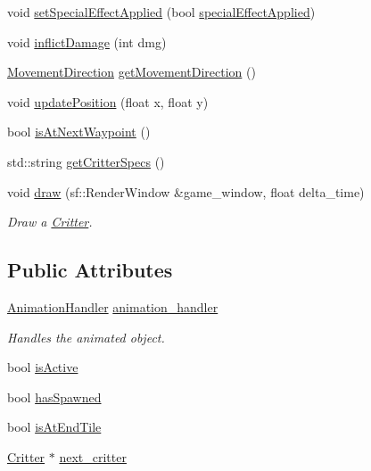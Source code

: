 \begin{DoxyCompactItemize}
\item 
void \hyperlink{class_critter_a662c3e493cd09b78df86afdc3c0725df}{set\+Special\+Effect\+Applied} (bool \hyperlink{class_critter_aa30e57414bd64c920dca286f87da5c3f}{special\+Effect\+Applied})
\item 
void \hyperlink{class_critter_a3601e12d79247c3345e9e828688cf321}{inflict\+Damage} (int dmg)
\item 
\hyperlink{class_critter_a42f4af08084e39edfdb55e38a5858cc4}{Movement\+Direction} \hyperlink{class_critter_affcdf706975d5a761acec7e5effea7b1}{get\+Movement\+Direction} ()
\item 
void \hyperlink{class_critter_a96462bdb554e60ee1c3bb76d7cde3da6}{update\+Position} (float x, float y)
\item 
bool \hyperlink{class_critter_ac2d188c14e482de7e28a9520d6f62a16}{is\+At\+Next\+Waypoint} ()
\item 
std\+::string \hyperlink{class_critter_ae0799b0a4602623632fa382e5ad0d0c8}{get\+Critter\+Specs} ()
\item 
void \hyperlink{class_critter_afe6dafa77006e5b6b7f3f905447af3fb}{draw} (sf\+::\+Render\+Window \&game\+\_\+window, float delta\+\_\+time)
\begin{DoxyCompactList}\small\item\em Draw a \hyperlink{class_critter}{Critter}. \end{DoxyCompactList}\end{DoxyCompactItemize}
\subsection*{Public Attributes}
\begin{DoxyCompactItemize}
\item 
\hyperlink{class_animation_handler}{Animation\+Handler} \hyperlink{class_critter_a9792a56974224a81ca5ceec3eb967ad6}{animation\+\_\+handler}
\begin{DoxyCompactList}\small\item\em Handles the animated object. \end{DoxyCompactList}\item 
bool \hyperlink{class_critter_a1c933b10b2a9cbc1dd7d1dbb57f758fd}{is\+Active}
\item 
bool \hyperlink{class_critter_a253cbf3d1e4c85d354d9c538ff7bb631}{has\+Spawned}
\item 
bool \hyperlink{class_critter_aa3f2aeb9f3b38fe33d94ca206d9eb24b}{is\+At\+End\+Tile}
\item 
\hyperlink{class_critter}{Critter} $\ast$ \hyperlink{class_critter_a6017fbb8c863a2456f43b88996720927}{next\+\_\+critter}
\end{DoxyCompactItemize}
